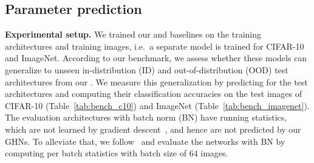 \subsection{Parameter prediction\label{sec:our_task}}


\textbf{Experimental setup.} We trained our \ghnours and baselines on the training architectures and training images, i.e.~a separate model is trained for CIFAR-10 and ImageNet. According to our \dataset benchmark, we assess whether these models can generalize to unseen in-distribution (ID) and out-of-distribution (OOD) test architectures from our \dataset. We measure this generalization by predicting \params for the test architectures and computing their classification accuracies on the test images of CIFAR-10 (Table~\ref{tab:bench_c10}) and ImageNet (Table~\ref{tab:bench_imagenet}). The evaluation architectures with batch norm (BN) have running statistics, which are not learned by gradient descent~\citep{ioffe2015batch}, and hence are not predicted by our GHNs. To alleviate that, we follow~\citep{zhang2018graph} and evaluate the networks with BN by computing per batch statistics with batch size of 64 images.%



